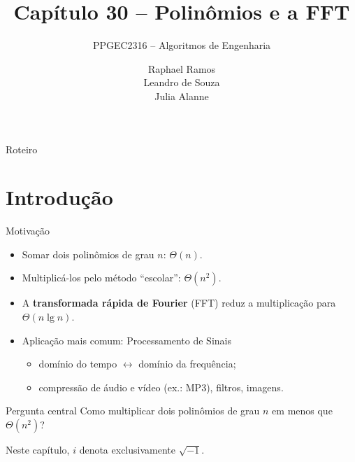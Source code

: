 \documentclass[aspectratio=169,10pt]{beamer}
\title{Capítulo 30 -- Polinômios e a FFT}
\subtitle{PPGEC2316 -- Algoritmos de Engenharia}
\author{Raphael Ramos \\ Leandro de Souza \\ Julia Alanne}
\institute{Universidade Federal do Rio Grande do Norte -- UFRN}
\date{}
\begin{document}
\maketitle

\begin{frame}{Roteiro}
  \tableofcontents
\end{frame}

\section{Introdução}

\begin{frame}{Motivação}
  \begin{itemize}
    \item Somar dois polinômios de grau $n$: $\Theta(n)$.
    \item Multiplicá-los pelo método ``escolar'': $\Theta(n^2)$.
    \item A \textbf{transformada rápida de Fourier} (FFT) reduz a multiplicação
          para $\Theta(n\lg n)$.
    \item Aplicação mais comum: Processamento de Sinais
      \begin{itemize}
        \item domínio do tempo $\leftrightarrow$ domínio da frequência;
        \item compressão de áudio e vídeo (ex.: MP3), filtros, imagens.
      \end{itemize}
  \end{itemize}
  \vspace{4pt}
  \begin{block}{Pergunta central}
    Como multiplicar dois polinômios de grau $n$ em menos que
    $\Theta(n^2)$?
  \end{block}
  \vspace{4pt}
  {\small Neste capítulo, $i$ denota exclusivamente $\sqrt{-1}$.}
\end{frame}
\end{document}
